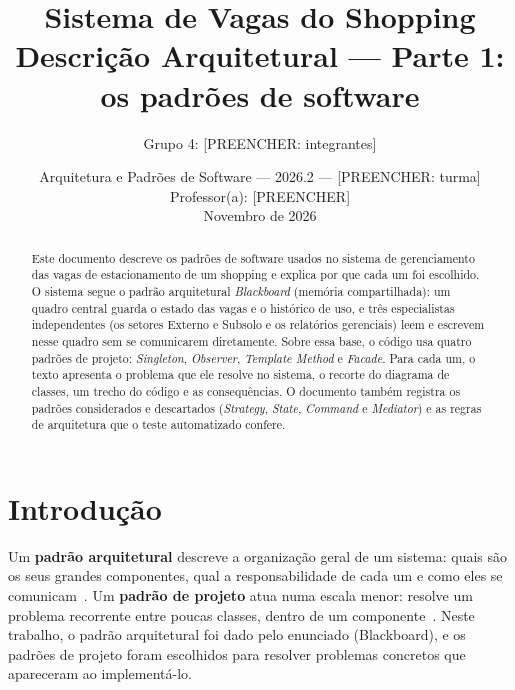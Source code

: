 

\title{\textbf{Sistema de Vagas do Shopping}\\[4pt]
\large Descrição Arquitetural --- Parte 1: os padrões de software}
\author{Grupo 4: [PREENCHER: integrantes]}
\date{Arquitetura e Padrões de Software --- 2026.2 --- [PREENCHER: turma]\\
Professor(a): [PREENCHER]\\[4pt]
Novembro de 2026}


\maketitle

\begin{abstract}
Este documento descreve os padrões de software usados no sistema de gerenciamento das vagas de estacionamento de um shopping e explica por que cada um foi escolhido. O sistema segue o padrão arquitetural \emph{Blackboard} (memória compartilhada): um quadro central guarda o estado das vagas e o histórico de uso, e três especialistas independentes (os setores Externo e Subsolo e os relatórios gerenciais) leem e escrevem nesse quadro sem se comunicarem diretamente. Sobre essa base, o código usa quatro padrões de projeto: \emph{Singleton}, \emph{Observer}, \emph{Template Method} e \emph{Facade}. Para cada um, o texto apresenta o problema que ele resolve no sistema, o recorte do diagrama de classes, um trecho do código e as consequências. O documento também registra os padrões considerados e descartados (\emph{Strategy}, \emph{State}, \emph{Command} e \emph{Mediator}) e as regras de arquitetura que o teste automatizado confere.
\end{abstract}

\section{Introdução}

Um \textbf{padrão arquitetural} descreve a organização geral de um sistema: quais são os seus grandes componentes, qual a responsabilidade de cada um e como eles se comunicam~\cite{buschmann1996,shaw1996}. Um \textbf{padrão de projeto} atua numa escala menor: resolve um problema recorrente entre poucas classes, dentro de um componente~\cite{gamma1994}. Neste trabalho, o padrão arquitetural foi dado pelo enunciado (Blackboard), e os padrões de projeto foram escolhidos para resolver problemas concretos que apareceram ao implementá-lo.

